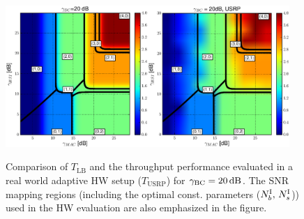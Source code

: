 \documentclass{article}
\begin{document}
\begin{figure}
\centering{}\includegraphics[width=0.48\textwidth]{fig/XOR_map_Througput_BC20}\quad\includegraphics[width=0.48\textwidth]{fig/XOR_map_Througput_USRP_BC20}\caption{Comparison of $T_{\mathrm{LB}}$ and the throughput performance evaluated
in a real world adaptive HW setup ($T_{\mathrm{USRP}}$) for $\gamma_{{\rm {BC}}}=20\,\mathrm{dB}$.
The SNR mapping regions (including the optimal const. parameters ($N_{b}^{{\rm I}},\,N_{s}^{{\rm I}}$))
used in the HW evaluation are also emphasized in the figure.\label{fig:CTUpp_SNR_map_BC20_USRP}}
\vspace*{-4ex}
\end{figure}
\end{document}
